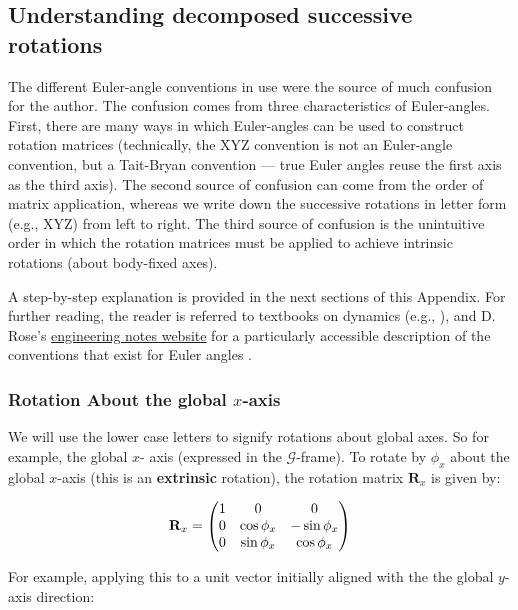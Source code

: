 \documentclass{article}
\begin{document}
\subsection{Understanding decomposed successive rotations}

The different Euler-angle conventions in use were the source of much confusion for the author. The confusion comes from three characteristics of Euler-angles. First, there are many ways in which Euler-angles can be used to construct rotation matrices (technically, the XYZ convention is not an Euler-angle convention, but a Tait-Bryan convention --- true Euler angles reuse the first axis as the third axis). The second source of confusion can come from the order of matrix application, whereas we write down the successive rotations in letter form (e.g., XYZ) from left to right. The third source of confusion is the unintuitive order in which the rotation matrices must be applied to achieve intrinsic rotations (about body-fixed axes).

A step-by-step explanation is provided in the next sections of this Appendix. For further reading, the reader is referred to textbooks on dynamics (e.g., \cite{kaneSpacecraftDynamics1983, valleryAdvancedDynamics2019}), and D. Rose's \href{https://danceswithcode.net/engineeringnotes/rotations_in_3d/rotations_in_3d_part1.html}{engineering notes website} for a particularly accessible description of the conventions that exist for Euler angles \cite{roseRotationsThreeDimensionsEuler2015}.


\subsubsection*{Rotation About the global \( x \)-axis}
We will use the lower case letters to signify rotations about global axes. So for example, the global \( x \)- axis (expressed in the \(\mathcal{G} \)-frame).
To rotate by \( \phi_x \) about the global \( x \)-axis (this is an \textbf{extrinsic} rotation), the rotation matrix \( \mathbf{R}_x \) is given by:

\begin{equation}
\mathbf{R}_x = \mqty(
1 & 0 & 0 \\
0 & \cos \phi_x & -\sin \phi_x \\
0 & \sin \phi_x & \cos \phi_x
)
\label{eq:Rx}
\end{equation}

For example, applying this to a unit vector initially aligned with the the global \( y \)-axis direction:
\end{document}
